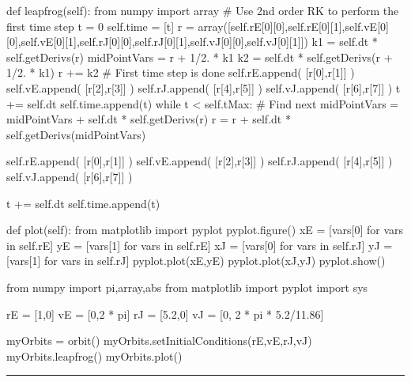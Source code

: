 \begin{codeexample}
\begin{VerbatimOut}{\listingFile}
    def leapfrog(self):
        from numpy import array
        # Use 2nd order RK to perform the first time step
        t = 0
        self.time = [t]
        r = array([self.rE[0][0],self.rE[0][1],self.vE[0][0],self.vE[0][1],self.rJ[0][0],self.rJ[0][1],self.vJ[0][0],self.vJ[0][1]])
        k1 = self.dt * self.getDerivs(r)
        midPointVars = r + 1/2. * k1
        k2 = self.dt * self.getDerivs(r + 1/2. * k1)
        r += k2
        # First time step is done
        self.rE.append( [r[0],r[1]]  )
        self.vE.append( [r[2],r[3]]  )
        self.rJ.append( [r[4],r[5]]  )
        self.vJ.append( [r[6],r[7]]  )
        t += self.dt
        self.time.append(t)
        while t < self.tMax:
            # Find next
            midPointVars = midPointVars + self.dt * self.getDerivs(r)
            r = r + self.dt * self.getDerivs(midPointVars)

            self.rE.append( [r[0],r[1]]  )
            self.vE.append( [r[2],r[3]]  )
            self.rJ.append( [r[4],r[5]]  )
            self.vJ.append( [r[6],r[7]]  )

            t += self.dt
            self.time.append(t)
            
    def plot(self):
        from matplotlib import pyplot
        pyplot.figure()
        xE = [vars[0] for vars in self.rE]
        yE = [vars[1] for vars in self.rE]
        xJ = [vars[0] for vars in self.rJ]
        yJ = [vars[1] for vars in self.rJ]
        pyplot.plot(xE,yE)
        pyplot.plot(xJ,yJ)
        pyplot.show()


from numpy import pi,array,abs
from matplotlib import pyplot
import sys

rE = [1,0]
vE = [0,2 * pi]
rJ = [5.2,0]
vJ = [0, 2 * pi * 5.2/11.86]

myOrbits = orbit()
myOrbits.setInitialConditions(rE,vE,rJ,vJ)
myOrbits.leapfrog()
myOrbits.plot()
\end{VerbatimOut}
\end{codeexample}
\else
\noindent\rule{4 in}{0.01 in}
\fi
